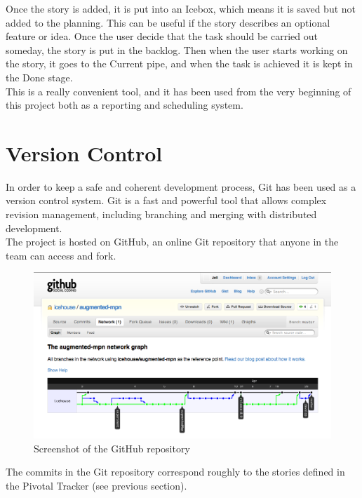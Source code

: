 Once the story is added, it is put into an Icebox, which means it is saved but not added to the planning. This can be useful if the story describes an optional feature or idea. Once the user decide that the task should be carried out someday, the story is put in the backlog. Then when the user starts working on the story, it goes to the Current pipe, and when the task is achieved it is kept in the Done stage.\\

This is a really convenient tool, and it has been used from the very beginning of this project both as a reporting and scheduling system.

\section{Version Control}

In order to keep a safe and coherent development process, Git has been used as a version control system. Git is a fast and powerful tool that allows complex revision management, including branching and merging with distributed development.\\

The project is hosted on GitHub, an online Git repository that anyone in the team can access and fork.\\

\begin{figure}[ht]
\center
\includegraphics[scale=0.4]{pics/github}
\caption{Screenshot of the GitHub repository}
\label{fig:pivotal_tracker}
\end{figure}

The commits in the Git repository correspond roughly to the stories defined in the Pivotal Tracker (see previous section).